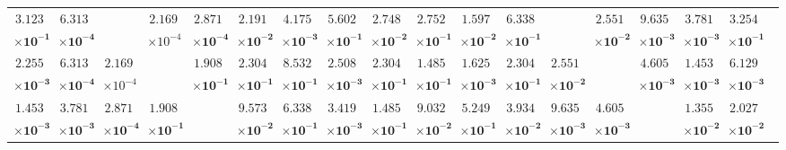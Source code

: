 \begin{table}[!ht]
{\begin{tabular}{|c|c|c|c|c|c|c|c|c|c|c|c|c|c|c|c|c|c|c|}
			$\mathbf{3.123}$ & $\mathbf{6.313}$ & \multirow{2}{*}{} & $2.169$ & $\mathbf{2.871}$ & $\mathbf{2.191}$ & $\mathbf{4.175}$ & $\mathbf{5.602}$ & $\mathbf{2.748}$ & $\mathbf{2.752}$ & $\mathbf{1.597}$ & $\mathbf{6.338}$ & \multirow{2}{*}{} & $\mathbf{2.551}$ & $\mathbf{9.635}$ & $\mathbf{3.781}$ & $\mathbf{3.254}$ & \multicolumn{2}{c}{} \\ 
			$\mathbf{\times 10^{-1}}$ & $\mathbf{\times 10^{-4}}$ & & $\times 10^{-4}$ & $\mathbf{\times 10^{-4}}$ & $\mathbf{\times 10^{-2}}$ & $\mathbf{\times 10^{-3}}$ & $\mathbf{\times 10^{-1}}$ & $\mathbf{\times 10^{-2}}$ & $\mathbf{\times 10^{-1}}$ & $\mathbf{\times 10^{-2}}$ & $\mathbf{\times 10^{-1}}$ & & $\mathbf{\times 10^{-2}}$ & $\mathbf{\times 10^{-3}}$ & $\mathbf{\times 10^{-3}}$ & $\mathbf{\times 10^{-1}}$ & \multicolumn{2}{c}{} \\ \cline{1-17}
			$\mathbf{2.255}$ & $\mathbf{6.313}$ & $2.169$ & \multirow{2}{*}{} & $\mathbf{1.908}$ & $\mathbf{2.304}$ & $\mathbf{8.532}$ & $\mathbf{2.508}$ & $\mathbf{2.304}$ & $\mathbf{1.485}$ & $\mathbf{1.625}$ & $\mathbf{2.304}$ & $\mathbf{2.551}$ & \multirow{2}{*}{} & $\mathbf{4.605}$ & $\mathbf{1.453}$ & $\mathbf{6.129}$ & \multicolumn{2}{c}{} \\ 
			$\mathbf{\times 10^{-3}}$ & $\mathbf{\times 10^{-4}}$ & $\times 10^{-4}$ & & $\mathbf{\times 10^{-1}}$ & $\mathbf{\times 10^{-1}}$ & $\mathbf{\times 10^{-1}}$ & $\mathbf{\times 10^{-3}}$ & $\mathbf{\times 10^{-1}}$ & $\mathbf{\times 10^{-1}}$ & $\mathbf{\times 10^{-3}}$ & $\mathbf{\times 10^{-1}}$ & $\mathbf{\times 10^{-2}}$ & & $\mathbf{\times 10^{-3}}$ & $\mathbf{\times 10^{-3}}$ & $\mathbf{\times 10^{-3}}$ & \multicolumn{2}{c}{} \\ \cline{1-17}
			$\mathbf{1.453}$ & $\mathbf{3.781}$ & $\mathbf{2.871}$ & $\mathbf{1.908}$ & \multirow{2}{*}{} & $\mathbf{9.573}$ & $\mathbf{6.338}$ & $\mathbf{3.419}$ & $\mathbf{1.485}$ & $\mathbf{9.032}$ & $\mathbf{5.249}$ & $\mathbf{3.934}$ & $\mathbf{9.635}$ & $\mathbf{4.605}$ & \multirow{2}{*}{} & $\mathbf{1.355}$ & $\mathbf{2.027}$ & \multicolumn{2}{c}{} \\ 
			$\mathbf{\times 10^{-3}}$ & $\mathbf{\times 10^{-3}}$ & $\mathbf{\times 10^{-4}}$ & $\mathbf{\times 10^{-1}}$ & & $\mathbf{\times 10^{-2}}$ & $\mathbf{\times 10^{-1}}$ & $\mathbf{\times 10^{-3}}$ & $\mathbf{\times 10^{-1}}$ & $\mathbf{\times 10^{-2}}$ & $\mathbf{\times 10^{-1}}$ & $\mathbf{\times 10^{-2}}$ & $\mathbf{\times 10^{-3}}$ & $\mathbf{\times 10^{-3}}$ & & $\mathbf{\times 10^{-2}}$ & $\mathbf{\times 10^{-2}}$ & \multicolumn{2}{c}{} \\ \cline{1-17}

\end{tabular}}
\end{table}
